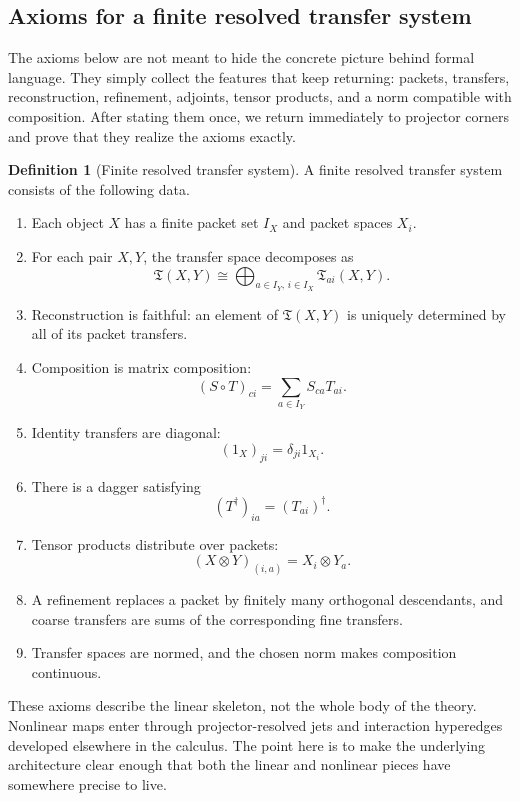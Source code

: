 \documentclass[11pt]{article}
\theoremstyle{definition}
\newtheorem{definition}[theorem]{Definition}
\theoremstyle{remark}
\begin{document}
\subsection{Axioms for a finite resolved transfer system}

The axioms below are not meant to hide the concrete picture behind formal language.  They simply collect the features that keep returning: packets, transfers, reconstruction, refinement, adjoints, tensor products, and a norm compatible with composition.  After stating them once, we return immediately to projector corners and prove that they realize the axioms exactly.

\begin{definition}[Finite resolved transfer system]
A finite resolved transfer system consists of the following data.
\begin{enumerate}[label=\textup{(R\arabic*)}]
\item Each object \(X\) has a finite packet set \(I_X\) and packet spaces \(X_i\).
\item For each pair \(X,Y\), the transfer space decomposes as
\[
\mathfrak T(X,Y)
\cong
\bigoplus_{a\in I_Y,\,i\in I_X}
\mathfrak T_{ai}(X,Y).
\]
\item Reconstruction is faithful: an element of \(\mathfrak T(X,Y)\) is uniquely determined by all of its packet transfers.
\item Composition is matrix composition:
\[
(S\circ T)_{ci}
=
\sum_{a\in I_Y}S_{ca}T_{ai}.
\]
\item Identity transfers are diagonal:
\[
(1_X)_{ji}=\delta_{ji}1_{X_i}.
\]
\item There is a dagger satisfying
\[
(T^\dagger)_{ia}=(T_{ai})^\dagger.
\]
\item Tensor products distribute over packets:
\[
(X\otimes Y)_{(i,a)}=X_i\otimes Y_a.
\]
\item A refinement replaces a packet by finitely many orthogonal descendants, and coarse transfers are sums of the corresponding fine transfers.
\item Transfer spaces are normed, and the chosen norm makes composition continuous.
\end{enumerate}
\end{definition}

These axioms describe the linear skeleton, not the whole body of the theory.  Nonlinear maps enter through projector-resolved jets and interaction hyperedges developed elsewhere in the calculus.  The point here is to make the underlying architecture clear enough that both the linear and nonlinear pieces have somewhere precise to live.
\end{document}
